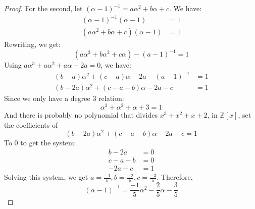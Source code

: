 \documentclass{article}
\begin{document}
\begin{proof}
        For the second, let $(\alpha - 1)^{-1} = a\alpha^{2} + b\alpha + c$. We have:
            \begin{align*}
                (\alpha - 1)^{-1}(\alpha - 1)           &= 1 \\
                (a\alpha^{2} + b\alpha + c)(\alpha - 1) &= 1   
            \end{align*}
        Rewriting, we get:
            \begin{equation*}
                (a\alpha^{3} + b\alpha^{2} + c\alpha) - (a - 1)^{-1} = 1   
            \end{equation*}
        Using $ a\alpha^{3} + a\alpha^{2} + a\alpha + 2a = 0$, we have:
            \begin{align*}
                (b - a)\alpha^{2} + (c - a)\alpha - 2a - (a - 1)^{-1} &= 1 \\
                (b - 2a)\alpha^{2} + (c - a - b)\alpha - 2a - c       &= 1   
            \end{align*}
        Since we only have a degree 3 relation:
            \begin{equation*}
                \alpha^{3} + \alpha^{2} + \alpha + 3 = 1
            \end{equation*}
        And there is probably no polynomial that divides $x^{3} + x^{2} + x + 2$, in $\mathbb{Z}[x]$, set the coefficients of
            \begin{equation*}
                (b - 2a)\alpha^{2} + (c - a - b)\alpha - 2a - c = 1
            \end{equation*}
        To $0$ to get the system:
            \begin{align*}
                b - 2a    &= 0 \\
                c - a - b &= 0 \\
                -2a - c   &= 1   
            \end{align*}
        Solving this system, we get $a = \frac{-1}{5}, b = \frac{-2}{5}, c = \frac{-3}{5}$. Therefore, 
            \begin{equation*}
                (\alpha - 1)^{-1} = \dfrac{-1}{5}\alpha^{2} - \dfrac{2}{5}\alpha - \dfrac{3}{5}
            \end{equation*}
    \end{proof}
\end{document}
